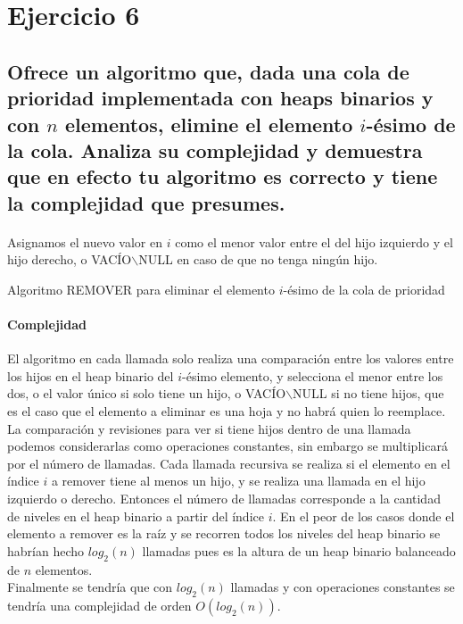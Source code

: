 \documentclass[12pt]{article}
\begin{document}
 \section{Ejercicio 6}
 \subsection{Ofrece un algoritmo que, dada una cola de prioridad implementada con heaps binarios y con $n$ elementos, elimine el elemento $i$-ésimo de la cola. Analiza su complejidad y demuestra que en efecto tu algoritmo es correcto y tiene la complejidad que presumes.}
 \paragraph{} 
 \begin{algorithm}[H]
 	\SetAlgoLined
		Asignamos el nuevo valor en $i$ como el menor valor entre el del hijo izquierdo y el hijo derecho, o VACÍO$\backslash$NULL en caso de que no tenga ningún hijo.\;
 	\caption{Algoritmo REMOVER para eliminar el elemento $i$-ésimo de la cola de prioridad}
 \end{algorithm}
\paragraph{Complejidad} El algoritmo en cada llamada solo realiza una comparación entre los valores entre los hijos en el heap binario del $i$-ésimo elemento, y selecciona el menor entre los dos, o el valor único si solo tiene un hijo, o VACÍO$\backslash$NULL si no tiene hijos, que es el caso que el elemento a eliminar es una hoja y no habrá quien lo reemplace. La comparación y revisiones para ver si tiene hijos dentro de una llamada podemos considerarlas como operaciones constantes, sin embargo se multiplicará por el número de llamadas. Cada llamada recursiva se realiza si el elemento en el índice $i$ a remover tiene al menos un hijo, y se realiza una llamada en el hijo izquierdo o derecho. Entonces el número de llamadas corresponde a la cantidad de niveles en el heap binario a partir del índice $i$. En el peor de los casos donde el elemento a remover es la raíz y se recorren todos los niveles del heap binario se habrían hecho $log_2(n)$ llamadas pues es la altura de un heap binario balanceado de $n$ elementos.\\ Finalmente se tendría que con $log_2(n)$ llamadas y con operaciones constantes se tendría una complejidad de orden $O(log_2(n))$.
\end{document}
